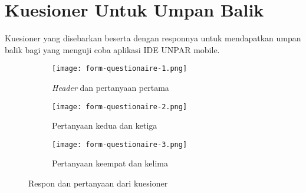 \chapter{Kuesioner Untuk Umpan Balik}
\label{lamp:F}

\def\scl{1}
\def\leg{} 
\def\std{none}
\def\ymin{}
\def\ymax{}

Kuesioner yang disebarkan beserta dengan responnya untuk mendapatkan umpan balik bagi yang menguji coba aplikasi IDE UNPAR mobile.

\begin{figure}[H] 
	\centering  
	\begin{subfigure}{.3\textwidth}
	\centering
	\texttt{[image: form-questionaire-1.png]}
	\caption{\textit{Header} dan pertanyaan pertama}
	\end{subfigure}  
	\hfill
	\begin{subfigure}{.3\textwidth}
	\centering
	\texttt{[image: form-questionaire-2.png]}
	\caption{Pertanyaan kedua dan ketiga}
	\end{subfigure}
	\hfill  
	\begin{subfigure}{.3\textwidth}
	\centering
	\texttt{[image: form-questionaire-3.png]}
	\caption{Pertanyaan keempat dan kelima}
	\end{subfigure}  
	\caption[Respon dan pertanyaan dari kuesioner] {Respon dan pertanyaan dari kuesioner}
	\label{fig:questionaire} 
\end{figure} 
